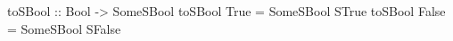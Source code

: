 \begin{code}
toSBool :: Bool -> SomeSBool
toSBool True  = SomeSBool STrue
toSBool False = SomeSBool SFalse
\end{code}
